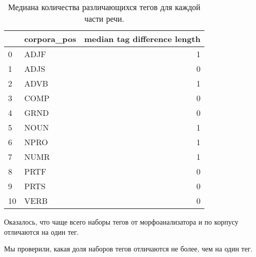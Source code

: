 \documentclass[a4paper,14pt]{article}
\begin{document}
	\begin{table}[h!]
		\begin{center}
			\begin{tabular}{llr}
		\toprule
		{} & corpora\_pos &  median tag difference length \\
		\midrule
		0  &        ADJF &                             1 \\
		1  &        ADJS &                             0 \\
		2  &        ADVB &                             1 \\
		3  &        COMP &                             0 \\
		4  &        GRND &                             0 \\
		5  &        NOUN &                             1 \\
		6  &        NPRO &                             1 \\
		7  &        NUMR &                             1 \\
		8  &        PRTF &                             0 \\
		9  &        PRTS &                             0 \\
		10 &        VERB &                             0 \\
		\bottomrule
		\end{tabular}
		\caption{Медиана количества различающихся тегов для каждой части речи.}
		\end{center}
	\end{table}

	\begin{center}
    \end{center}

	Оказалось, что чаще всего наборы тегов от морфоанализатора и по корпусу отличаются на один тег.

	Мы проверили, какая доля наборов тегов отличаются не более, чем на один тег. 
\end{document}
